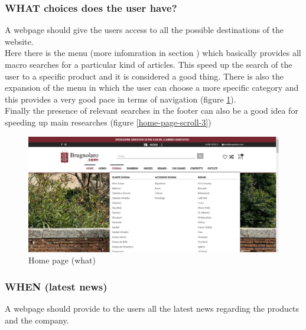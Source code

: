 \subsubsection{WHAT choices does the user have?}\label{what}
A webpage should give the users access to all the possible
destinations of the website.\\
Here there is the menu (more infomration in section ) which basically provides all macro searches
for a particular kind of articles. This speed up the search of the user to a specific product and
it is considered a good thing. There is also the expansion of the menu in which the user can choose
a more specific category and this provides a very good pace in terms of navigation
(figure \ref{home-page-what}).\\

Finally the presence of relevant searches in the footer can also be a good idea for
speeding up main researches (figure \ref{home-page-scroll-3})
\begin{figure}[!h] 
    \centering 
    \includegraphics[scale = 0.29]{images/what_menu.png} 
    \caption{Home page (what)}
    \label{home-page-what}
\end{figure}
\newpage
\subsubsection{WHEN (latest news)}
A webpage should provide to the users all the latest news regarding the products and the company.\\

